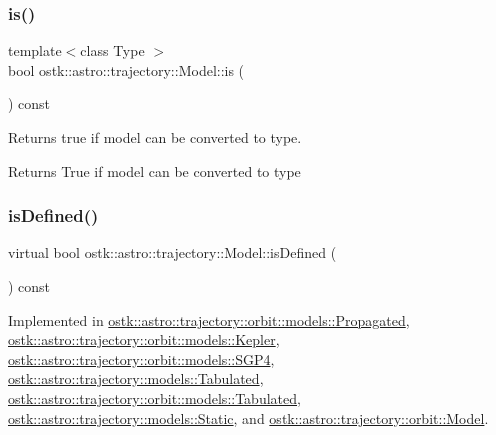 \subsubsection{\texorpdfstring{is()}{is()}}
{\footnotesize\ttfamily template$<$class Type $>$ \\
bool ostk\+::astro\+::trajectory\+::\+Model\+::is (\begin{DoxyParamCaption}{ }\end{DoxyParamCaption}) const\hspace{0.3cm}{\ttfamily [inline]}}



Returns true if model can be converted to type. 

\begin{DoxyReturn}{Returns}
True if model can be converted to type 
\end{DoxyReturn}
\mbox{\label{classostk_1_1astro_1_1trajectory_1_1_model_a0d5cf6f754905f06c0ec1e39618c20a1}} 
\subsubsection{\texorpdfstring{is\+Defined()}{isDefined()}}
{\footnotesize\ttfamily virtual bool ostk\+::astro\+::trajectory\+::\+Model\+::is\+Defined (\begin{DoxyParamCaption}{ }\end{DoxyParamCaption}) const\hspace{0.3cm}{\ttfamily [pure virtual]}}



Implemented in \hyperlink{classostk_1_1astro_1_1trajectory_1_1orbit_1_1models_1_1_propagated_a530fd6bc017c74dedc43ced5fe843a03}{ostk\+::astro\+::trajectory\+::orbit\+::models\+::\+Propagated}, \hyperlink{classostk_1_1astro_1_1trajectory_1_1orbit_1_1models_1_1_kepler_a4c74402d5483a51e5e0fe1920cd52ec4}{ostk\+::astro\+::trajectory\+::orbit\+::models\+::\+Kepler}, \hyperlink{classostk_1_1astro_1_1trajectory_1_1orbit_1_1models_1_1_s_g_p4_ab18e0666588bd517c190942b1a54ed18}{ostk\+::astro\+::trajectory\+::orbit\+::models\+::\+S\+G\+P4}, \hyperlink{classostk_1_1astro_1_1trajectory_1_1models_1_1_tabulated_a379da4c10a738c3f4578042c9bae0c91}{ostk\+::astro\+::trajectory\+::models\+::\+Tabulated}, \hyperlink{classostk_1_1astro_1_1trajectory_1_1orbit_1_1models_1_1_tabulated_ad114ba4762b54211f74f0aa3ac5eedae}{ostk\+::astro\+::trajectory\+::orbit\+::models\+::\+Tabulated}, \hyperlink{classostk_1_1astro_1_1trajectory_1_1models_1_1_static_a5a80d75c9215af9b198c9f8653c5bc17}{ostk\+::astro\+::trajectory\+::models\+::\+Static}, and \hyperlink{classostk_1_1astro_1_1trajectory_1_1orbit_1_1_model_a13c5b5693dd86a072da0bd0e319bacc2}{ostk\+::astro\+::trajectory\+::orbit\+::\+Model}.

